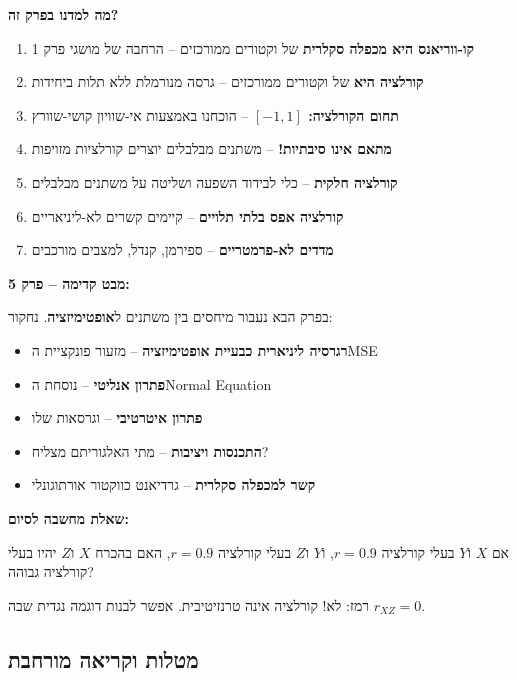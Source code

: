 
\textbf{מה למדנו בפרק זה?}

\begin{enumerate}
\item \textbf{קו-ווריאנס היא מכפלה סקלרית} של וקטורים ממורכזים – הרחבה של מושגי פרק \num{1}
\item \textbf{קורלציה היא } של וקטורים ממורכזים – גרסה מנורמלת ללא תלות ביחידות
\item \textbf{תחום הקורלציה: $[-1, 1]$} – הוכחנו באמצעות אי-שוויון קושי-שוורץ
\item \textbf{מתאם אינו סיבתיות!} – משתנים מבלבלים יוצרים קורלציות מזויפות
\item \textbf{קורלציה חלקית} – כלי לבידוד השפעה ושליטה על משתנים מבלבלים
\item \textbf{קורלציה אפס \neq{} בלתי תלויים} – קיימים קשרים לא-ליניאריים
\item \textbf{מדדים לא-פרמטריים} – ספירמן, קנדל,  למצבים מורכבים
\end{enumerate}

\textbf{מבט קדימה – פרק \num{5}:}

בפרק הבא נעבור מיחסים בין משתנים ל\textbf{אופטימיזציה}. נחקור:

\begin{itemize}
\item \textbf{רגרסיה ליניארית כבעיית אופטימיזציה} – מזעור פונקציית ה\en{-}MSE
\item \textbf{פתרון אנליטי} – נוסחת ה\en{-}Normal Equation
\item \textbf{פתרון איטרטיבי} –  וגרסאות שלו
\item \textbf{התכנסות ויציבות} – מתי האלגוריתם מצליח?
\item \textbf{קשר למכפלה סקלרית} – גרדיאנט כווקטור אורתוגונלי
\end{itemize}

\textbf{שאלת מחשבה לסיום:}

אם $X$ ו\en{-}$Y$ בעלי קורלציה $r = 0.9$, ו\en{-}$Y$ ו\en{-}$Z$ בעלי קורלציה $r = 0.9$, האם בהכרח $X$ ו\en{-}$Z$ יהיו בעלי קורלציה גבוהה?

רמז: לא! קורלציה אינה טרנזיטיבית. אפשר לבנות דוגמה נגדית שבה $r_{XZ} = 0$.

\subsection*{מטלות וקריאה מורחבת}


